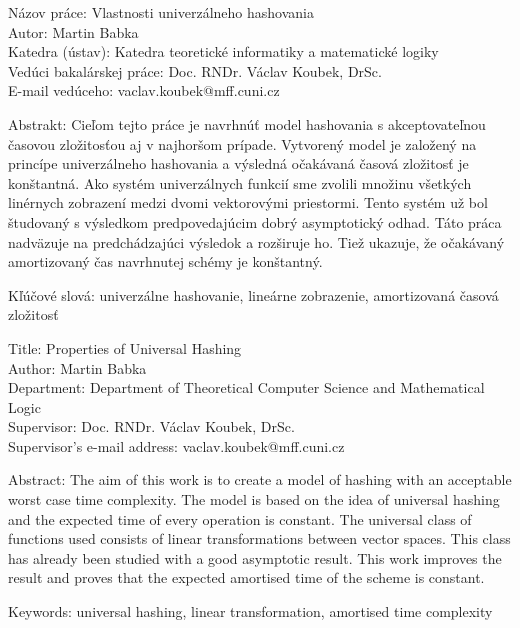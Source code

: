 \noindent
\begin{flushleft}
Názov práce: Vlastnosti univerzálneho hashovania\\
Autor: Martin Babka\\
Katedra (ústav): Katedra teoretické informatiky a matematické logiky\\
Vedúci bakalárskej práce: Doc. RNDr. Václav Koubek, DrSc.\\
E-mail vedúceho: vaclav.koubek@mff.cuni.cz\\

\end{flushleft}
\noindent Abstrakt: Cieľom tejto práce je navrhnúť model hashovania s akceptovateľnou ča\-so\-vou zložitosťou aj v najhoršom prípade. Vytvorený model je založený na princípe univerzálneho hashovania a výsledná očakávaná časová zložitosť je konštantná. Ako systém univerzálnych funkcií sme zvolili množinu všetkých linérnych zobrazení medzi dvomi vektorovými priestormi. Tento systém už bol študovaný s výsledkom predpovedajúcim dobrý asymptotický odhad. Táto práca nadväzuje na predchádzajúci výsledok a rozširuje ho. Tiež ukazuje, že očakávaný amortizovaný čas navrhnutej schémy je konštantný.
\begin{flushleft}
\noindent Kľúčové slová: univerzálne hashovanie, lineárne zobrazenie, amortizovaná časová zložitosť

\vspace{10mm}

\noindent
Title: Properties of Universal Hashing\\
Author: Martin Babka\\
Department: Department of Theoretical Computer Science and Mathematical Logic\\
Supervisor: Doc. RNDr. Václav Koubek, DrSc.\\
Supervisor's e-mail address: vaclav.koubek@mff.cuni.cz\\

\end{flushleft}
\noindent Abstract: The aim of this work is to create a model of hashing with an acceptable worst case time complexity. The model is based on the idea of universal hashing and the expected time of every operation is constant. The universal class of functions used consists of linear transformations between vector spaces. This class has already been studied with a good asymptotic result. This work improves the result and proves that the expected amortised time of the scheme is constant.
\begin{flushleft}
\noindent Keywords: universal hashing, linear transformation, amortised time complexity

\end{flushleft}
\newpage
